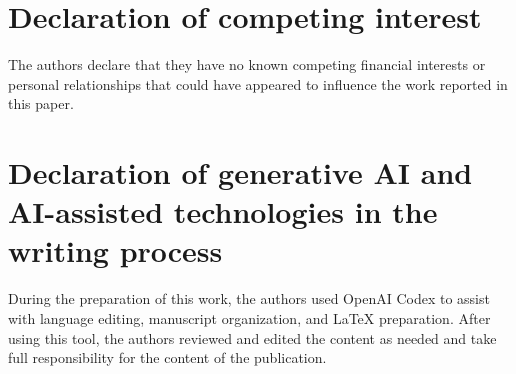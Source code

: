 \documentclass[preprint,12pt]{elsarticle}
\theoremstyle{remark}
\begin{document}
\section*{Declaration of competing interest}
The authors declare that they have no known competing financial interests or personal relationships that could have appeared to influence the work reported in this paper.

\section*{Declaration of generative AI and AI-assisted technologies in the writing process}
During the preparation of this work, the authors used OpenAI Codex to assist with language editing, manuscript organization, and LaTeX preparation. After using this tool, the authors reviewed and edited the content as needed and take full responsibility for the content of the publication.
\end{document}
